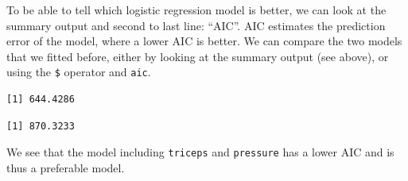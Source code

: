 \documentclass[
  letterpaper,
  DIV=11,
  numbers=noendperiod]{scrreprt}
\newenvironment{Shaded}{\begin{snugshade}}{\end{snugshade}}
\newcommand{\AttributeTok}[1]{\textcolor[rgb]{0.40,0.45,0.13}{#1}}
\newcommand{\CommentTok}[1]{\textcolor[rgb]{0.37,0.37,0.37}{#1}}
\newcommand{\FunctionTok}[1]{\textcolor[rgb]{0.28,0.35,0.67}{#1}}
\newcommand{\NormalTok}[1]{\textcolor[rgb]{0.00,0.23,0.31}{#1}}
\newcommand{\OtherTok}[1]{\textcolor[rgb]{0.00,0.23,0.31}{#1}}
\newcommand{\SpecialCharTok}[1]{\textcolor[rgb]{0.37,0.37,0.37}{#1}}
\newcommand{\StringTok}[1]{\textcolor[rgb]{0.13,0.47,0.30}{#1}}
\begin{document}
To be able to tell which logistic regression model is better, we can
look at the summary output and second to last line: ``AIC''. AIC
estimates the prediction error of the model, where a lower AIC is
better. We can compare the two models that we fitted before, either by
looking at the summary output (see above), or using the \texttt{\$}
operator and \texttt{aic}.

\begin{Shaded}
\end{Shaded}

\begin{verbatim}
[1] 644.4286
\end{verbatim}

\begin{Shaded}
\end{Shaded}

\begin{verbatim}
[1] 870.3233
\end{verbatim}

We see that the model including \texttt{triceps} and \texttt{pressure}
has a lower AIC and is thus a preferable model.
\end{document}
